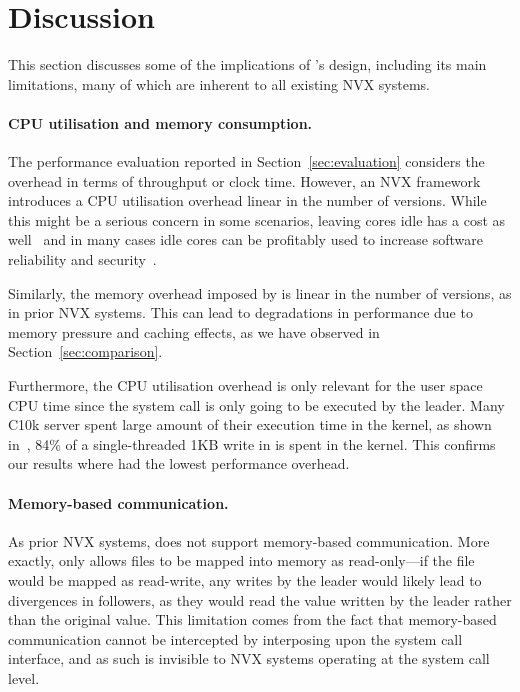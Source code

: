 \section{Discussion}
\label{efficient-execution:discussion}

This section discusses some of the implications of \varan's design,
including its main limitations, many of which are inherent to all
existing NVX systems.

\paragraph{CPU utilisation and memory consumption.} The performance
evaluation reported in Section~\ref{sec:evaluation} considers the
overhead in terms of throughput or clock time.  However, an NVX
framework introduces a CPU utilisation overhead linear in the number
of versions.  While this might be a serious concern in some scenarios,
leaving cores idle has a cost as well~\cite{barroso2007} and in many
cases idle cores can be profitably used to increase software reliability
and security~\cite{cox2006,multiplicity,orchestra09,diehard06,mvupdates12}.

Similarly, the memory overhead imposed by \varan is linear in the
number of versions, as in prior NVX systems.  This can lead to
degradations in performance due to memory pressure and caching
effects, as we have observed in Section~\ref{sec:comparison}.

Furthermore, the CPU utilisation overhead is only relevant for the user space
CPU time since the system call is only going to be executed by the leader. Many
C10k server spent large amount of their execution time in the kernel, \ie as
shown in~\cite{redisoverhead}, 84\% of a single-threaded 1KB write in \redis
is spent in the kernel. This confirms our results where \redis had the lowest
performance overhead.

\paragraph{Memory-based communication.} As prior NVX systems, \varan
does not support memory-based communication.  More exactly, \varan
only allows files to be mapped into memory as read-only---if the file
would be mapped as read-write, any writes by the leader would likely
lead to divergences in followers, as they would read the value written
by the leader rather than the original value.  This limitation comes
from the fact that memory-based communication cannot be intercepted by
interposing upon the system call interface, and as such is invisible
to NVX systems operating at the system call level.


